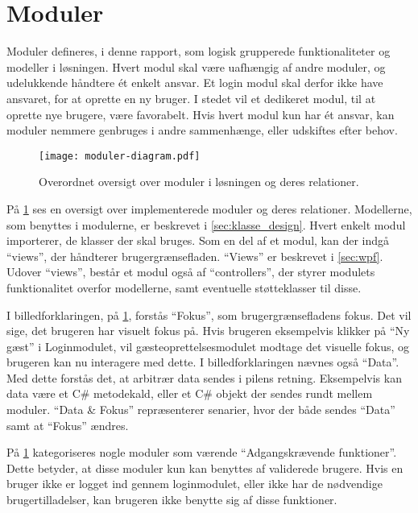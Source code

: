 \section{Moduler}
\label{sec:moduler}

Moduler defineres, i denne rapport, som logisk grupperede funktionaliteter og modeller i løsningen. Hvert modul skal være uafhængig af andre moduler, og udelukkende håndtere ét enkelt ansvar. Et login modul skal derfor ikke have ansvaret, for at oprette en ny bruger. I stedet vil et dedikeret modul, til at oprette nye brugere, være favorabelt. Hvis hvert modul kun har ét ansvar, kan moduler nemmere genbruges i andre sammenhænge, eller udskiftes efter behov.

\begin{figure}
  \centering
  \texttt{[image: moduler-diagram.pdf]}
  \caption{Overordnet oversigt over moduler i løsningen og deres relationer.}
  \label{fig:mod}
\end{figure}

På \cref{fig:mod} ses en oversigt over implementerede moduler og deres relationer. Modellerne, som benyttes i modulerne, er beskrevet i \cref{sec:klasse_design}. Hvert enkelt modul importerer, de klasser der skal bruges. Som en del af et modul, kan der indgå \enquote{views}, der håndterer brugergrænsefladen. \enquote{Views} er beskrevet i \cref{sec:wpf}. Udover \enquote{views}, består et modul også af \enquote{controllers}, der styrer modulets funktionalitet overfor modellerne, samt eventuelle støtteklasser til disse.

I billedforklaringen, på \cref{fig:mod}, forstås \enquote{Fokus}, som brugergrænsefladens fokus. Det vil sige, det brugeren har visuelt fokus på. Hvis brugeren eksempelvis klikker på \enquote{Ny gæst} i Loginmodulet, vil gæsteoprettelsesmodulet modtage det visuelle fokus, og brugeren kan nu interagere med dette. I billedforklaringen nævnes også \enquote{Data}. Med dette forstås det, at arbitrær data sendes i pilens retning. Eksempelvis kan data være et C\# metodekald, eller et C\# objekt der sendes rundt mellem moduler. \enquote{Data \& Fokus} repræsenterer senarier, hvor der både sendes \enquote{Data} samt at \enquote{Fokus} ændres.

På \cref{fig:mod} kategoriseres nogle moduler som værende \enquote{Adgangskrævende funktioner}. Dette betyder, at disse moduler kun kan benyttes af validerede brugere. Hvis en bruger ikke er logget ind gennem loginmodulet, eller ikke har de nødvendige brugertilladelser, kan brugeren ikke benytte sig af disse funktioner.

